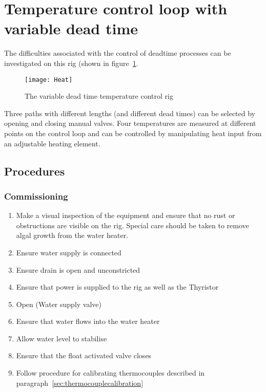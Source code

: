 \section{Temperature control loop with variable dead time}
The difficulties associated with the control of deadtime processes can be investigated on this rig (shown in figure~\ref{fig:rig:heat}.
\begin{figure}
	\centering
	\texttt{[image: Heat]}
	\caption{The variable dead time temperature control rig}
	\label{fig:rig:heat}
\end{figure}
Three paths with different lengths (and different dead times) can be selected by opening and closing manual valves.  Four temperatures are measured at different points on the control loop and can be controlled by manipulating heat input from an adjustable heating element. 

\subsection{Procedures}
\subsubsection{Commissioning}
\begin{enumerate}
	\item Make a visual inspection of the equipment and ensure that no rust or obstructions are visible on the rig.  Special care should be taken to remove algal growth from the water heater.
	\item Ensure water supply is connected
	\item Ensure drain is open and unconstricted
	\item Ensure that power is supplied to the rig as well as the Thyristor
	\item Open  (Water supply valve)
	\item Ensure that water flows into the water heater
	\item Allow water level to stabilise
	\item Ensure that the float activated valve closes
	\item Follow procedure for calibrating thermocouples described in paragraph~\ref{sec:thermocouplecalibration}
\end{enumerate}

